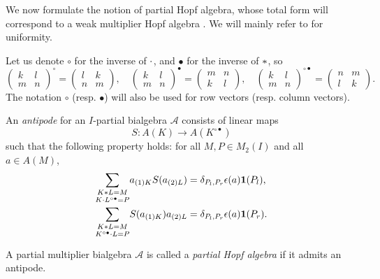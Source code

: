 We now formulate the notion of partial Hopf algebra, whose total form will correspond to a weak multiplier Hopf algebra \cite{Boh1,VDW2,VDW1}. We will mainly refer to \cite{Boh1} for uniformity.%

 Let us denote $\circ$ for the inverse of $\cdot$, and $\bullet$ for the inverse of $*$, so \[\begin{pmatrix} k & l \\ m & n \end{pmatrix}^{\circ} = \begin{pmatrix} l & k \\ n & m \end{pmatrix},\quad \begin{pmatrix} k & l \\ m & n \end{pmatrix}^{\bullet} = \begin{pmatrix} m & n \\ k & l \end{pmatrix},\quad \begin{pmatrix} k & l \\ m & n \end{pmatrix}^{\circ \bullet} = \begin{pmatrix} n & m \\ l & k \end{pmatrix}.\] The notation $\circ$ (resp. $\bullet$) will also be used for row vectors (resp. column vectors).

\begin{Def}\label{DefPartBiAlgAnt} An \emph{antipode} for an
  $I$-partial bialgebra $\mathscr{A}$ consists of linear
maps \[S:A(K)\rightarrow A(K^{\circ\bullet})\]
  such that the following property holds: for all $M,P\in M_2(I)$ and
  all $a\in A(M)$, \begin{align} \label{eq:antipode-pi-l}\underset{K\cdot
      L^{\circ\bullet}=P}{\sum_{K* L = M}} a_{(1)K}S(a_{(2)L})&=
    \delta_{P_l,P_r}\epsilon(a)\mathbf{1}(P_l),
    \\ \label{eq:antipode-pi-r}
    \underset{K^{\circ\bullet}\cdot L=P}{\sum_{K* L = M}}
    S(a_{(1)K})a_{(2)L}&=
    \delta_{P_l,P_r}\epsilon(a)\mathbf{1}(P_r).\end{align}

A partial multiplier bialgebra $\mathscr{A}$ is called a \emph{partial Hopf algebra} if it admits an antipode.
\end{Def} 

